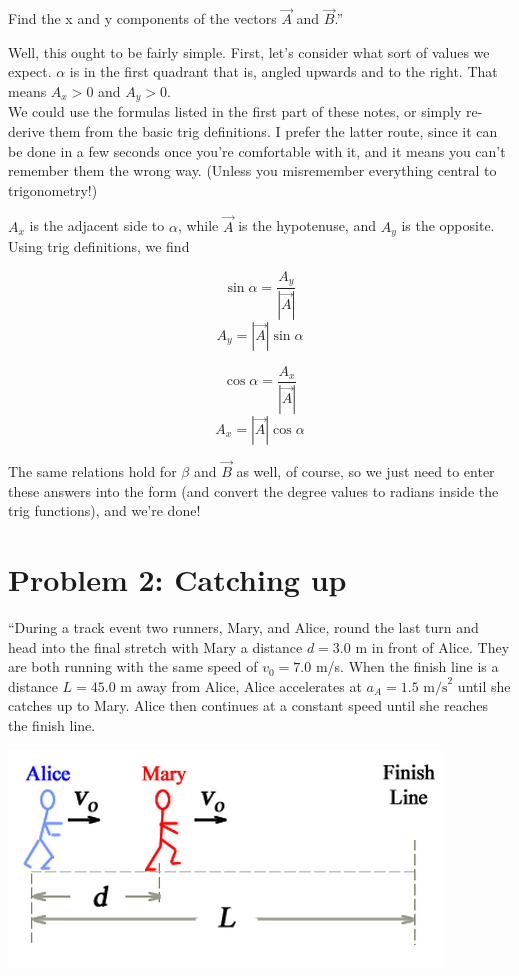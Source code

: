 \documentclass[12pt,a4paper]{report}
\begin{document}
Find the x and y components of the vectors $\vec{A}$ and $\vec{B}$.''

Well, this ought to be fairly simple. First, let's consider what sort of values we expect. $\alpha$ is in the first quadrant that is, angled upwards and to the right. That means $A_x > 0$ and $A_y > 0$.\\
We could use the formulas listed in the first part of these notes, or simply re-derive them from the basic trig definitions. I prefer the latter route, since it can be done in a few seconds once you're comfortable with it, and it means you can't remember them the wrong way. (Unless you misremember everything central to trigonometry!)

$A_x$ is the adjacent side to $\alpha$, while $\vec{A}$ is the hypotenuse, and $A_y$ is the opposite. Using trig definitions, we find

\begin{equation}
\sin \alpha = \frac{A_y}{|\vec{A}|}
\end{equation}
\begin{equation}
A_y = |\vec{A}| \sin \alpha
\end{equation}

\begin{equation}
\cos \alpha = \frac{A_x}{|\vec{A}|}
\end{equation}
\begin{equation}
A_x = |\vec{A}| \cos \alpha
\end{equation}

The same relations hold for $\beta$ and $\vec{B}$ as well, of course, so we just need to enter these answers into the form (and convert the degree values to radians inside the trig functions), and we're done!

\section{Problem 2: Catching up}

``During a track event two runners, Mary, and Alice, round the last turn and head into the final stretch with Mary a distance $d = 3.0$ m in front of Alice. They are both running with the same speed of $v_0 = 7.0$ m/s. When the finish line is a distance $L = 45.0$ m away from Alice, Alice accelerates at $a_A = 1.5\text{ m/s}^2$ until she catches up to Mary. Alice then continues at a constant speed until she reaches the finish line.

\begin{center}
\includegraphics[scale=0.8]{Graphics/h1p2}
\end{center}
\end{document}
